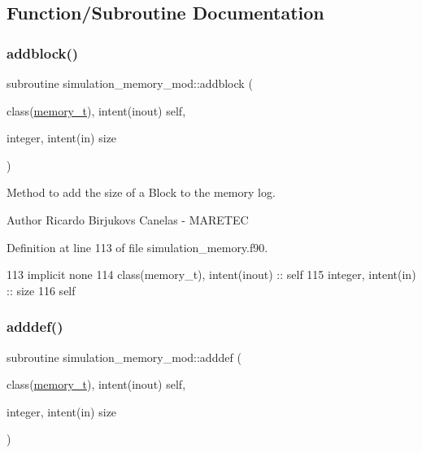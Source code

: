 \subsection{Function/\+Subroutine Documentation}
\mbox{\label{namespacesimulation__memory__mod_a4169689db37b3ba35e092096a7019f80}} 
\subsubsection{\texorpdfstring{addblock()}{addblock()}}
{\footnotesize\ttfamily subroutine simulation\+\_\+memory\+\_\+mod\+::addblock (\begin{DoxyParamCaption}\item[{class(\mbox{\hyperlink{structsimulation__memory__mod_1_1memory__t}{memory\+\_\+t}}), intent(inout)}]{self,  }\item[{integer, intent(in)}]{size }\end{DoxyParamCaption})\hspace{0.3cm}{\ttfamily [private]}}



Method to add the size of a Block to the memory log. 

\begin{DoxyAuthor}{Author}
Ricardo Birjukovs Canelas -\/ M\+A\+R\+E\+T\+EC 
\end{DoxyAuthor}


Definition at line 113 of file simulation\+\_\+memory.\+f90.


\begin{DoxyCode}
113     \textcolor{keywordtype}{implicit none}
114     \textcolor{keywordtype}{class}(memory\_t), \textcolor{keywordtype}{intent(inout)} :: self
115     \textcolor{keywordtype}{integer}, \textcolor{keywordtype}{intent(in)} :: size
116     self%
\end{DoxyCode}
\mbox{\label{namespacesimulation__memory__mod_ac6d6853bc462947d24a8f6234d625138}} 
\subsubsection{\texorpdfstring{adddef()}{adddef()}}
{\footnotesize\ttfamily subroutine simulation\+\_\+memory\+\_\+mod\+::adddef (\begin{DoxyParamCaption}\item[{class(\mbox{\hyperlink{structsimulation__memory__mod_1_1memory__t}{memory\+\_\+t}}), intent(inout)}]{self,  }\item[{integer, intent(in)}]{size }\end{DoxyParamCaption})\hspace{0.3cm}{\ttfamily [private]}}




